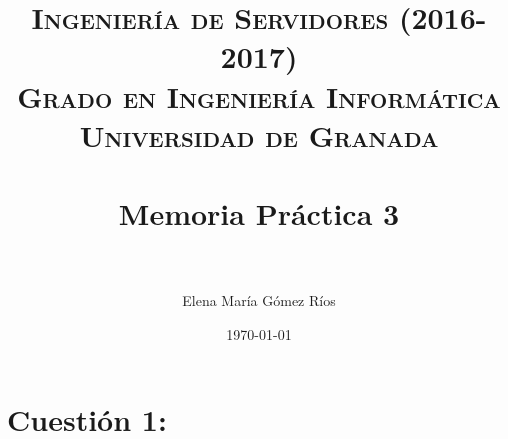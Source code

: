 


\title{	
\normalfont \normalsize 
\textsc{\textbf{Ingeniería de Servidores (2016-2017)} \\ Grado en Ingeniería Informática \\ Universidad de Granada} \\ [25pt] %
\horrule{0.5pt} \\[0.4cm] %
\huge Memoria Práctica 3 \\ %
\horrule{2pt} \\[0.5cm] %
}

\author{Elena María Gómez Ríos} %

\date{\normalsize\today} %




\maketitle %

\newpage %

\tableofcontents %

\listoffigures

\listoftables

\newpage

 


\newpage


\section{Cuestión 1:}

